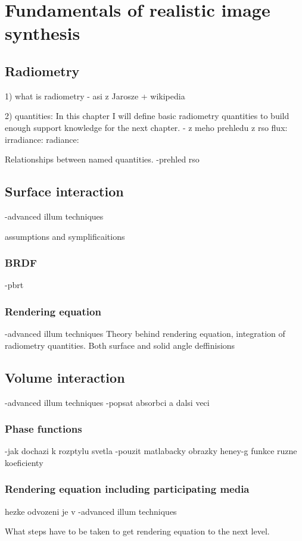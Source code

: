 \chapter{Fundamentals of realistic image synthesis}

\section{Radiometry}
1) what is radiometry
- asi z Jarosze + wikipedia

2) quantities:
In this chapter I will define basic radiometry quantities to build enough support knowledge for the next chapter. 
- z meho prehledu z rso
flux: 
irradiance:
radiance:

Relationships between named quantities.
-prehled rso

\section{Surface interaction}
-advanced illum techniques

assumptions and symplificaitions 
\subsection{BRDF}
-pbrt
\subsection{Rendering equation}
-advanced illum techniques
Theory behind rendering equation, integration of radiometry quantities. Both surface and solid angle deffinisions

\section{Volume interaction}
-advanced illum techniques
-popsat absorbci a dalsi veci
\subsection{Phase functions}
-jak dochazi k rozptylu svetla
-pouzit matlabacky obrazky heney-g funkce ruzne koeficienty

\subsection{Rendering equation including participating media}
hezke odvozeni je v -advanced illum techniques

What steps have to be taken to get rendering equation to the next level.

